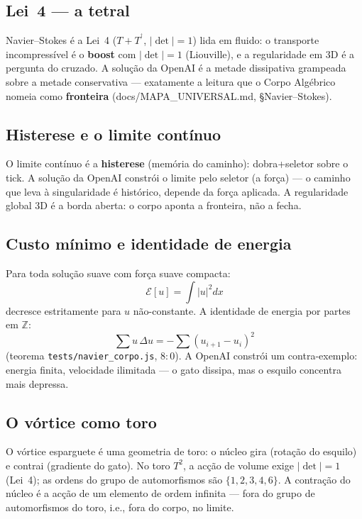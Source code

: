 \documentclass[11pt,a4paper]{article}
\newcommand\code[1]{\texttt{\small #1}}
\newcommand\dg{^{\dagger}}
\begin{document}
\subsection{Lei~4 — a tetral}
Navier--Stokes é a Lei~4 ($T+T^{\dg}$, $|\det|=1$) lida em fluido:
o transporte incompressível é o \textbf{boost} com $|\det|=1$
(Liouville), e a regularidade em 3D é a pergunta do cruzado.
A solução da OpenAI é a metade dissipativa grampeada sobre a
metade conservativa --- exatamente a leitura que o Corpo Algébrico
nomeia como \textbf{fronteira} (docs/MAPA\_UNIVERSAL.md, §Navier--Stokes).

\subsection{Histerese e o limite contínuo}
O limite contínuo é a \textbf{histerese} (memória do caminho):
dobra+seletor sobre o tick. A solução da OpenAI constrói o
limite pelo seletor (a força) --- o caminho que leva à singularidade
é histórico, depende da força aplicada. A regularidade global 3D
é a borda aberta: o corpo aponta a fronteira, não a fecha.

\subsection{Custo mínimo e identidade de energia}
Para toda solução suave com força suave compacta:
\[
\mathcal E[u]=\int|u|^2dx
\]
decresce estritamente para $u$ não-constante. A identidade de
energia por partes em $\mathbb Z$:
\[
\sum u\,\Delta u=-\sum(u_{i+1}-u_i)^2
\]
(teorema \code{tests/navier\_corpo.js}, $8{:}0$).
A OpenAI constrói um contra-exemplo: energia finita, velocidade
ilimitada --- o gato dissipa, mas o esquilo concentra mais depressa.

\subsection{O vórtice como toro}
O vórtice esparguete é uma geometria de toro: o núcleo gira
(rotação do esquilo) e contrai (gradiente do gato). No toro
$T^2$, a acção de volume exige $|\det|=1$ (Lei~4); as ordens
do grupo de automorfismos são $\{1,2,3,4,6\}$. A contração
do núcleo é a acção de um elemento de ordem infinita --- fora
do grupo de automorfismos do toro, i.e., fora do corpo, no limite.
\end{document}
